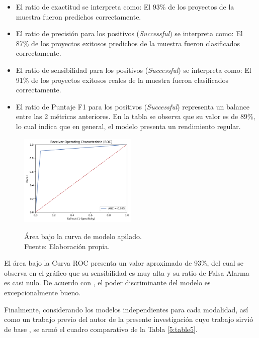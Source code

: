 \begin{itemize}
	\item El ratio de exactitud se interpreta como: El 93\% de los proyectos de la muestra fueron predichos correctamente.
	\item El ratio de precisión para los positivos (\textit{Successful}) se interpreta como: El 87\% de los proyectos exitosos predichos de la muestra fueron clasificados correctamente. 
	\item El ratio de sensibilidad para los positivos (\textit{Successful}) se interpreta como: El 91\% de los proyectos exitosos reales de la muestra fueron clasificados correctamente.
	\item El ratio de Puntaje F1 para los positivos (\textit{Successful}) representa un balance entre las 2 métricas anteriores. En la tabla se observa que su valor es de 89\%, lo cual indica que en general, el modelo presenta un rendimiento regular.
\end{itemize}

\begin{figure}[!ht]
	\begin{center}
		\includegraphics[width=0.50\textwidth]{5/figures/stacked_auc.png}
		\caption[Área bajo la curva de modelo apilado]{Área bajo la curva de modelo apilado.\\
		Fuente: Elaboración propia.}
		\vspace{-0.5cm}
		\label{5:fig12}
	\end{center}
\end{figure}

El área bajo la Curva ROC presenta un valor aproximado de 93\%, del cual se observa en el gráfico que su sensibilidad es muy alta y su ratio de Falsa Alarma es casi nulo. De acuerdo con \cite{bk_britos2006datamining}, el poder discriminante del modelo es excepcionalmente bueno.

Finalmente, considerando los modelos independientes para cada modalidad, así como un trabajo previo del autor de la presente investigación cuyo trabajo sirvió de base \parencite{pr_puente2019kickstarter_prediction}, se armó el cuadro comparativo de la Tabla \ref{5:table5}.

